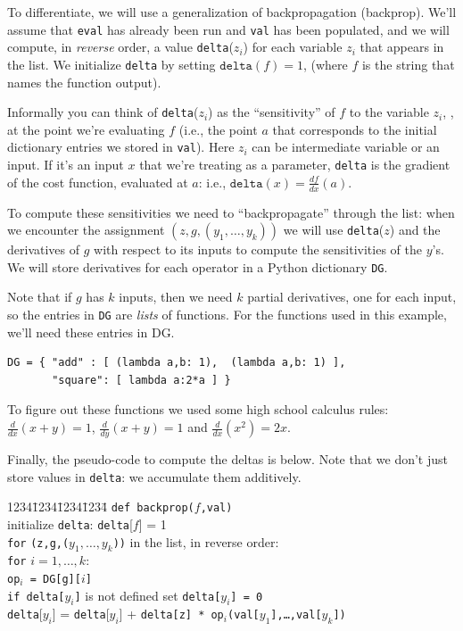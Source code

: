 \documentclass[12pt]{article}
\newcommand{\cd}[1]{\texttt{#1}}
\newcommand{\deriv}[2]{\frac{d{}#1}{d{}#2}}
\begin{document}
To differentiate, we will use a generalization of backpropagation
(backprop). We'll assume that \cd{eval} has already been run and
\cd{val} has been populated, and we will compute, in \emph{reverse}
order, a value \cd{delta}($z_i$) for each variable $z_i$ that appears
in the list.  We initialize \cd{delta} by setting $\cd{delta}(f)=1$,
(where $f$ is the string that names the function output).  

Informally you can think of \cd{delta}($z_i$) as the ``sensitivity''
of $f$ to the variable $z_i$, , at the point we're evaluating $f$
(i.e., the point $a$ that corresponds to the initial dictionary
entries we stored in \cd{val}). Here $z_i$ can be intermediate
variable or an input.  If it's an input $x$ that we're treating as a
parameter, \cd{delta} is the gradient of the cost function, evaluated
at $a$: i.e., $\cd{delta}(x) = \deriv{f}{x}(a)$.  

To compute these sensitivities we need to ``backpropagate'' through
the list: when we encounter the assignment \((z,g,(y_1,\ldots,y_k))\)
we will use \cd{delta}($z$) and the derivatives of $g$ with respect to
its inputs to compute the sensitivities of the $y$'s.  We will store
derivatives for each operator in a Python dictionary \cd{DG}. 

Note that if $g$ has $k$ inputs, then we need $k$ partial derivatives,
one for each input, so the entries in \cd{DG} are \emph{lists} of
functions. For the functions used in this example, we'll need
these entries in DG.
\begin{verbatim}
DG = { "add" : [ (lambda a,b: 1),  (lambda a,b: 1) ],  
       "square": [ lambda a:2*a ] }
\end{verbatim}
To figure out these functions we used some high school calculus rules:
$\deriv{}{x}(x+y)=1$, $\deriv{}{y}(x+y)=1$ and $\deriv{}{x}(x^2)=2x$.

Finally, the pseudo-code to compute the deltas is below.  Note that we
don't just store values in \cd{delta}: we accumulate them additively.

\begin{tabbing}1234\=1234\=1234\=1234\=\kill
\cd{def backprop($f$,val)} \\
\> initialize \cd{delta}: \cd{delta}[$f$] = 1\\
\> \cd{for} \cd{(z,g,($y_1,\ldots,y_k$))} in the list, in reverse order:\\
\>     \> \cd{for} $i=1,\ldots,k$:\\
\>     \>    \> \cd{op$_i$ = DG[g][$i$]} \\
\>     \>    \> \cd{if delta[$y_i$]} is not defined set \cd{delta[$y_i$] = 0} \\
\>     \>    \> \cd{delta}[$y_i$] = \cd{delta}[$y_i$] + \cd{delta[z] * op$_i$(val[$y_1$],\ldots,val[$y_k$])}\\
\end{tabbing}
\end{document}
